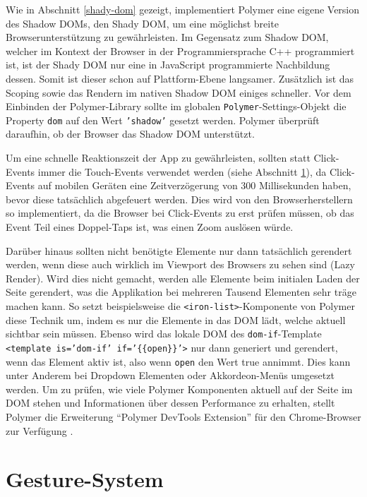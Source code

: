 Wie in Abschnitt \ref{shady-dom} gezeigt, implementiert Polymer eine eigene Version des Shadow \ac{DOM}s, den Shady \ac{DOM}, um eine möglichst breite Browserunterstützung zu gewährleisten. Im Gegensatz zum Shadow \ac{DOM}, welcher im Kontext der Browser in der Programmiersprache C++ programmiert ist, ist der Shady \ac{DOM} nur eine in JavaScript programmierte Nachbildung dessen. Somit ist dieser schon auf Plattform-Ebene langsamer. Zusätzlich ist das Scoping sowie das Rendern im nativen Shadow \ac{DOM} einiges schneller. Vor dem Einbinden der Polymer-Library sollte im globalen \texttt{Polymer}-Settings-Objekt die Property \texttt{dom} auf den Wert \texttt{'shadow'} gesetzt werden. Polymer überprüft daraufhin, ob der Browser das Shadow \ac{DOM} unterstützt.

Um eine schnelle Reaktionszeit der App zu gewährleisten, sollten statt Click-Events immer die Touch-Events verwendet werden (siehe Abschnitt \ref{gesture-system}), da Click-Events auf mobilen Geräten eine Zeitverzögerung von 300 Millisekunden haben, bevor diese tat\-s\"ach\-lich abgefeuert werden. Dies wird von den Browserherstellern so implementiert, da die Browser bei Click-Events zu erst prüfen müssen, ob das Event Teil eines Doppel-Taps ist, was einen Zoom auslösen würde.

Darüber hinaus sollten nicht benötigte Elemente nur dann tatsächlich gerendert werden, wenn diese auch wirklich im Viewport des Browsers zu sehen sind (Lazy Render). Wird dies nicht gemacht, werden alle Elemente beim initialen Laden der Seite gerendert, was die Applikation bei mehreren Tausend Elementen sehr träge machen kann. So setzt beispielsweise die \texttt{\textless{}iron-list\textgreater{}}-Komponente von Polymer diese Technik um, indem es nur die Elemente in das \ac{DOM} lädt, welche aktuell sichtbar sein müssen. Ebenso wird das lokale \ac{DOM} des \texttt{dom-if}-Template \texttt{\textless{}template\ is='dom-if'\ if='\{\{open\}\}'\textgreater{}} nur dann generiert und gerendert, wenn das Element aktiv ist, also wenn \texttt{open} den Wert true annimmt. Dies kann unter Anderem bei Dropdown Elementen oder Akkordeon-Menüs umgesetzt werden. Um zu prüfen, wie viele Polymer Komponenten aktuell auf der Seite im \ac{DOM} stehen und Informationen über dessen Performance zu erhalten, stellt Polymer die Erweiterung ``Polymer DevTools Extension'' für den Chrome-Browser zur Verfügung \cite{citeulike:13915202}.


\section{Gesture-System}\label{gesture-system}

